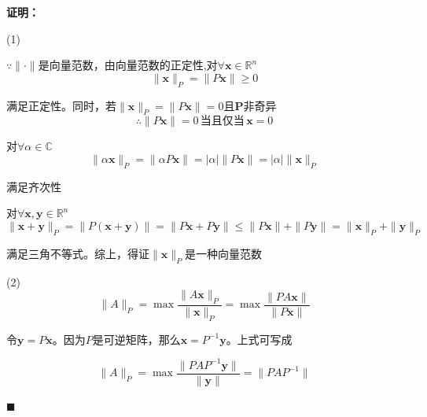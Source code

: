 \documentclass[UTF8,12pt,a4paper]{ctexart}
\newenvironment{proofcn}
  {\noindent\textbf{证明：}\quad}
  {\hfill$\blacksquare$\par\medskip}
\begin{document}
\begin{proofcn}

  (1)

  \(\because \|\cdot\|\)是向量范数，由向量范数的正定性,对\(\forall \boldsymbol{x}\in \mathbb{R}^{n}\)
  \[
    \|\boldsymbol{x}\|_P=\|P\boldsymbol{x}\|\ge 0
  \]

  满足正定性。同时，若\(\|\boldsymbol{x}\|_P=\|P\boldsymbol{x}\|=0\)且\(\boldsymbol{P}\)非奇异
  \[
  \therefore\|P\boldsymbol{x}\|=0\,\mbox{当且仅当}\,\boldsymbol{x}=0 
  \]

  对\(\forall \alpha \in \mathbb{C}\)
\[
\|\alpha \boldsymbol{x}\|_P=\|\alpha P\boldsymbol{x}\|=|\alpha|\| P\boldsymbol{x}\|=|\alpha|\|\boldsymbol{x}\|_P
\]

满足齐次性

  对\(\forall \boldsymbol{x},\boldsymbol{y} \in \mathbb{R}^n\)
\[
\| \boldsymbol{x}+\boldsymbol{y} \|_P=\|P(\boldsymbol{x}+\boldsymbol{y})\|=\|P\boldsymbol{x}+P\boldsymbol{y}\|\le \|P\boldsymbol{x}\|+\|P\boldsymbol{y}\|=\|\boldsymbol{x}\|_P+\|\boldsymbol{y}\|_P
\]


满足三角不等式。综上，得证\(\|\boldsymbol{x}\|_P\)是一种向量范数


  (2)
\[
\|A\|_P=\max \frac{\|A\boldsymbol{x}\|_P}{\|\boldsymbol{x}\|_P}=\max \frac{\|PA\boldsymbol{x}\|}{\|P\boldsymbol{x}\|}
\]
  
令\(\boldsymbol{y}=P\boldsymbol{x}\)。因为\(P\)是可逆矩阵，那么\(\boldsymbol{x}=P^{-1}\boldsymbol{y}\)。上式可写成


\[
\|A\|_P=\max \frac{\|PAP^{-1}\boldsymbol{y}\|}{\|\boldsymbol{y}\|}=\|PAP^{-1}\|
\]
  

\end{proofcn}
\end{document}
